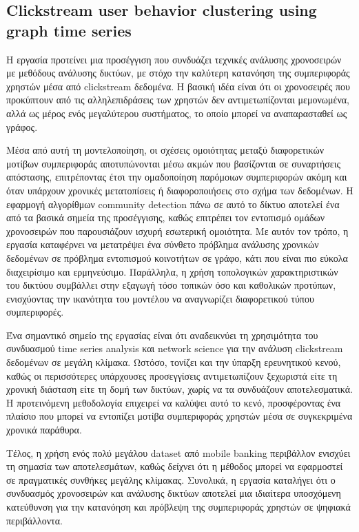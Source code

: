 \documentclass[12pt,a4paper]{article}
\begin{document}
	\subsection{Clickstream user behavior clustering using graph time series}
    
	Η εργασία \cite{DeOliveira2025} προτείνει μια προσέγγιση που συνδυάζει τεχνικές ανάλυσης χρονοσειρών με μεθόδους ανάλυσης δικτύων, με στόχο την καλύτερη κατανόηση της συμπεριφοράς χρηστών μέσα από clickstream δεδομένα. Η βασική ιδέα είναι ότι οι χρονοσειρές που προκύπτουν από τις αλληλεπιδράσεις των χρηστών δεν αντιμετωπίζονται μεμονωμένα, αλλά ως μέρος ενός μεγαλύτερου συστήματος, το οποίο μπορεί να αναπαρασταθεί ως γράφος.
	
	 Μέσα από αυτή τη μοντελοποίηση, οι σχέσεις ομοιότητας μεταξύ διαφορετικών μοτίβων συμπεριφοράς αποτυπώνονται μέσω ακμών που βασίζονται σε συναρτήσεις απόστασης, επιτρέποντας έτσι την ομαδοποίηση παρόμοιων συμπεριφορών ακόμη και όταν υπάρχουν χρονικές μετατοπίσεις ή διαφοροποιήσεις στο σχήμα των δεδομένων.
	Η εφαρμογή αλγορίθμων community detection πάνω σε αυτό το δίκτυο αποτελεί ένα από τα βασικά σημεία της προσέγγισης, καθώς επιτρέπει τον εντοπισμό ομάδων χρονοσειρών που παρουσιάζουν ισχυρή εσωτερική ομοιότητα. Με αυτόν τον τρόπο, η εργασία καταφέρνει να μετατρέψει ένα σύνθετο πρόβλημα ανάλυσης χρονικών δεδομένων σε πρόβλημα εντοπισμού κοινοτήτων σε γράφο, κάτι που είναι πιο εύκολα διαχειρίσιμο και ερμηνεύσιμο. Παράλληλα, η χρήση τοπολογικών χαρακτηριστικών του δικτύου συμβάλλει στην εξαγωγή τόσο τοπικών όσο και καθολικών προτύπων, ενισχύοντας την ικανότητα του μοντέλου να αναγνωρίζει διαφορετικού τύπου συμπεριφορές.
	
	Ένα σημαντικό σημείο της εργασίας είναι ότι αναδεικνύει τη χρησιμότητα του συνδυασμού time series analysis και network science για την ανάλυση clickstream δεδομένων σε μεγάλη κλίμακα. Ωστόσο, τονίζει και την ύπαρξη ερευνητικού κενού, καθώς οι περισσότερες υπάρχουσες προσεγγίσεις αντιμετωπίζουν ξεχωριστά είτε τη χρονική διάσταση είτε τη δομή των δικτύων, χωρίς να τα συνδυάζουν αποτελεσματικά. Η προτεινόμενη μεθοδολογία επιχειρεί να καλύψει αυτό το κενό, προσφέροντας ένα πλαίσιο που μπορεί να εντοπίζει μοτίβα συμπεριφοράς χρηστών μέσα σε συγκεκριμένα χρονικά παράθυρα.
	
	Τέλος, η χρήση ενός πολύ μεγάλου dataset από mobile banking περιβάλλον ενισχύει τη σημασία των αποτελεσμάτων, καθώς δείχνει ότι η μέθοδος μπορεί να εφαρμοστεί σε πραγματικές συνθήκες μεγάλης κλίμακας. Συνολικά, η εργασία καταλήγει ότι ο συνδυασμός χρονοσειρών και ανάλυσης δικτύων αποτελεί μια ιδιαίτερα υποσχόμενη κατεύθυνση για την κατανόηση και πρόβλεψη της συμπεριφοράς χρηστών σε ψηφιακά περιβάλλοντα.
	
\end{document}
